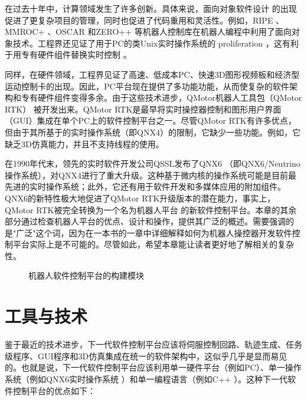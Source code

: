 \documentclass[UTF8,a4paper,12pt]{ctexart}
\begin{document}
在过去十年中，计算领域发生了许多创新。具体来说，面向对象软件设计 \cite{Stroustrup1991} 的出现促进了更复杂项目的管理，同时也促进了代码重用和灵活性。例如，RIPE \cite{Miller1991}、MMROC+ \cite{Zielinski1997}、OSCAR \cite{Kapoor1996} 和ZERO++ \cite{Pelich1996} 等机器人控制库在机器人编程中利用了面向对象技术。工程界还见证了用于PC的类Unix实时操作系统的 proliferation \cite{QSSL}，这有利于用专有硬件组件替换实时控制 \cite{Costescu1999}。

同样，在硬件领域，工程界见证了高速、低成本PC、快速3D图形视频板和经济型运动控制卡的出现。因此，PC平台现在提供了多功能功能，从而使复杂的软件架构和专有硬件组件变得多余。由于这些技术进步，QMotor机器人工具包（QMotor RTK）\cite{Loffler2001} 被开发出来。QMotor RTK是最早将实时操控器控制和图形用户界面（GUI）集成在单个PC上的软件控制平台之一。尽管QMotor RTK有许多优点，但由于其所基于的实时操作系统（即QNX4）的限制，它缺少一些功能。例如，它缺乏3D仿真能力，并且不支持线程的使用。

在1990年代末，领先的实时软件开发公司QSSL发布了QNX6 \cite{QSSL}（即QNX6/Neutrino操作系统），对QNX4进行了重大升级。这种基于微内核的操作系统可能是目前最先进的实时操作系统；此外，它还有用于软件开发和多媒体应用的附加组件。QNX6的新特性极大地促进了QMotor RTK升级版本的潜在能力，事实上，QMotor RTK被完全转换为一个名为机器人平台 \cite{Bhargava2001} 的新软件控制平台。本章的其余部分通过检查机器人平台的优点、设计和操作，提供其广泛的概述。需要强调的是"广泛"这个词，因为在一本书的一章中详细解释如何为机器人操控器开发软件控制平台实际上是不可能的。尽管如此，希望本章能让读者更好地了解相关的复杂性。

\begin{figure}[htbp]
\centering
{}
\caption{机器人软件控制平台的构建模块}
\label{fig:10.1.1}
\end{figure}

\section{工具与技术}

鉴于最近的技术进步，下一代软件控制平台应该将伺服控制回路、轨迹生成、任务级程序、GUI程序和3D仿真集成在统一的软件架构中，这似乎几乎是显而易见的。也就是说，下一代软件控制平台应该利用单一硬件平台（例如PC）、单一操作系统（例如QNX6实时操作系统 \cite{QSSL}）和单一编程语言（例如C++ \cite{Stroustrup1998}）。这种下一代软件控制平台的优点如下：
\end{document}
